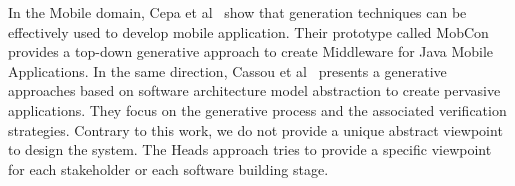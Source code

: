 In the Mobile domain, Cepa et al~\cite{1385821} show that generation techniques can be effectively used to develop mobile application. Their prototype called MobCon provides a top-down generative approach to create Middleware for Java Mobile Applications. In the same direction, Cassou et al~\cite{Cassou:2011:LSA:1985793.1985852} presents a generative approaches based on software architecture model abstraction to create pervasive applications. They focus on the generative process and the associated verification strategies. Contrary to this work, we do not provide a unique abstract viewpoint to design the system. The Heads approach tries to provide a specific viewpoint for each stakeholder or each software building stage.
